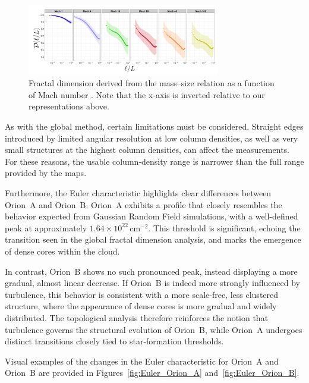 \begin{figure}[t]
    \centering
    \includegraphics[width=0.75\textwidth]{figures/beattie_fractal_dimension.png}
    \caption{Fractal dimension derived from the mass–size relation as a function of Mach number \cite{beattie2019relation}.  
    Note that the x-axis is inverted relative to our representations above.}
    \label{fig:beattie_fractal_dimension}
\end{figure}

As with the global method, certain limitations must be considered.  
Straight edges introduced by limited angular resolution at low column densities, as well as very small structures at the highest column densities, can affect the measurements.  
For these reasons, the usable column‑density range is narrower than the full range provided by the maps.

Furthermore, the Euler characteristic highlights clear differences between Orion~A and Orion~B.  
Orion~A exhibits a profile that closely resembles the behavior expected from Gaussian Random Field simulations, with a well-defined peak at approximately \(1.64 \times 10^{22}\,\mathrm{cm}^{-2}\).  
This threshold is significant, echoing the transition seen in the global fractal dimension analysis, and marks the emergence of dense cores within the cloud.

In contrast, Orion~B shows no such pronounced peak, instead displaying a more gradual, almost linear decrease.  
If Orion~B is indeed more strongly influenced by turbulence, this behavior is consistent with a more scale-free, less clustered structure, where the appearance of dense cores is more gradual and widely distributed.  
The topological analysis therefore reinforces the notion that turbulence governs the structural evolution of Orion~B, while Orion~A undergoes distinct transitions closely tied to star-formation thresholds.

Visual examples of the changes in the Euler characteristic for Orion~A and Orion~B are provided in Figures~\ref{fig:Euler_Orion_A} and~\ref{fig:Euler_Orion_B}.

